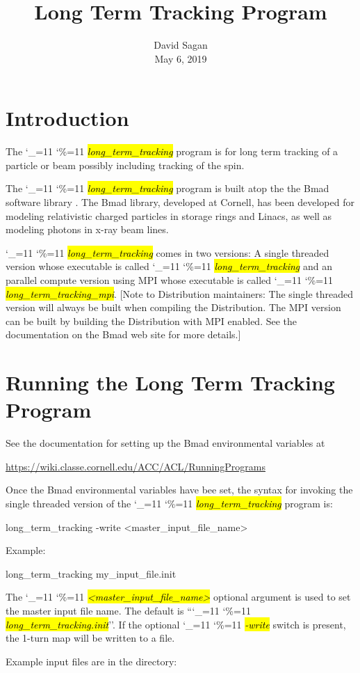 \documentclass{hitec}
\title{Long Term Tracking Program}
\author{}
\date{David Sagan \\ May 6, 2019}
\newcommand\dottcmd[1]{\hl{\em#1}\endgroup}
\newcommand{\vn}{\begingroup\catcode`\_=11 \catcode`\%=11 \dottcmd}
\newcommand{\ltt}{\vn{long_term_tracking}\xspace}
\newcommand{\Section}[1]{\section{#1}\vspace*{-1ex}}
\begin{document}
\maketitle

\tableofcontents


\Section{Introduction} 

The \ltt program is for long term tracking of a particle or beam possibly
including tracking of the spin.

The \ltt program is built atop the the Bmad software library \cite{b:bmad}. The Bmad library,
developed at Cornell, has been developed for modeling relativistic charged particles in storage
rings and Linacs, as well as modeling photons in x-ray beam lines.

\ltt comes in two versions: A single threaded version whose executable is called
\vn{long_term_tracking} and an parallel compute version using MPI whose executable is called
\vn{long_term_tracking_mpi}. [Note to Distribution maintainers: The single threaded version will
always be built when compiling the Distribution. The MPI version can be built by building the
Distribution with MPI enabled. See the documentation on the Bmad web site for more details.]

\Section{Running the Long Term Tracking Program} 
\label{s:run}

See the documentation for setting up the Bmad environmental variables at
\begin{code}
  \url{https://wiki.classe.cornell.edu/ACC/ACL/RunningPrograms}
\end{code}

Once the Bmad environmental variables have bee set, the syntax for invoking the single threaded
version of the \ltt program is:
\begin{code}
  long_term_tracking {-write} {<master_input_file_name>}
\end{code}
Example:
\begin{code}
  long_term_tracking my_input_file.init
\end{code}
The \vn{<master_input_file_name>} optional argument is used to set the master input file name. The
default is ``\vn{long_term_tracking.init}''. If the optional \vn{-write} switch is present, the
1-turn map will be written to a file.

Example input files are in the directory:
\end{document}

